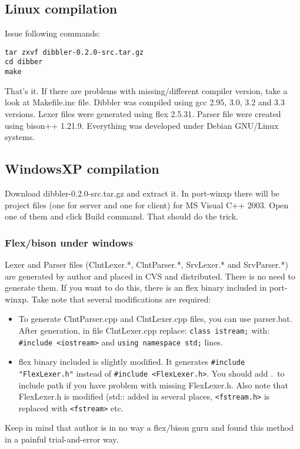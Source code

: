 \subsection{Linux compilation}
Issue following commands:
\begin{verbatim}
tar zxvf dibbler-0.2.0-src.tar.gz
cd dibber
make
\end{verbatim}
That's it. If there are problems with missing/different compiler
version, take a look at Makefile.inc file. Dibbler was compiled using
gcc 2.95, 3.0, 3.2 and 3.3 versions. Lexer files were generated using
flex 2.5.31. Parser file were created using bison++ 1.21.9. Everything
was developed under Debian GNU/Linux systems.

\subsection{WindowsXP compilation}
Download dibbler-0.2.0-src.tar.gz and extract it. In port-winxp there
will be project files (one for server and one for client) for MS
Visual C++ 2003. Open one of them and click Build command. That should
do the trick.

\subsubsection{Flex/bison under windows}

Lexer and Parser files (ClntLexer.*, ClntParser.*, SrvLexer.* and
SrvParser.*) are generated by author and placed in CVS and
distributed. There is no need to generate them. If you want to do
this, there is an flex binary included in port-winxp. Take note that
several modifications are required:

\begin{itemize}
\item To generate ClntParser.cpp and ClntLexer.cpp files, you can use
parser.bat. After generation, in file ClntLexer.cpp replace: \verb+class istream;+
with: \verb+#include <iostream>+ and \verb+using namespace std;+ lines.
\item flex binary included is slightly modified. It generates
\verb+#include "FlexLexer.h"+ instead of \verb+#include <FlexLexer.h>+. You should
add .\ to include path if you have problem with missing FlexLexer.h.
Also note that FlexLexer.h is modified (std:: added in several places,
\verb+<fstream.h>+ is replaced with \verb+<fstream>+ etc.
\end{itemize}

Keep in mind that author is in no way a flex/bison guru and found this method
in a painful trial-and-error way. 
